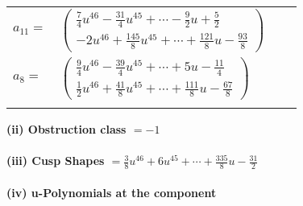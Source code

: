 \documentclass[1p]{elsarticle_modified}
\theoremstyle{definition}
\begin{document}
\begin{tabular}{m{7pt} m{180pt} m{7pt} m{180pt} }
\flushright $a_{11}=$&$\begin{pmatrix}\frac{7}{4} u^{46}-\frac{31}{4} u^{45}+\cdots-\frac{9}{2} u+\frac{5}{2}\\-2 u^{46}+\frac{145}{8} u^{45}+\cdots+\frac{121}{8} u-\frac{93}{8}\end{pmatrix}$ \\
\flushright $a_{8}=$&$\begin{pmatrix}\frac{9}{4} u^{46}-\frac{39}{4} u^{45}+\cdots+5 u-\frac{11}{4}\\\frac{1}{2} u^{46}+\frac{41}{8} u^{45}+\cdots+\frac{111}{8} u-\frac{67}{8}\end{pmatrix}$\\&\end{tabular}
\flushleft \textbf{(ii) Obstruction class $= -1$}\\~\\
\flushleft \textbf{(iii) Cusp Shapes $= \frac{3}{8} u^{46}+6 u^{45}+\cdots+\frac{335}{8} u-\frac{31}{2}$}\\~\\
\newpage\renewcommand{\arraystretch}{1}
\flushleft \textbf{(iv) u-Polynomials at the component}\newline \\
\end{document}
